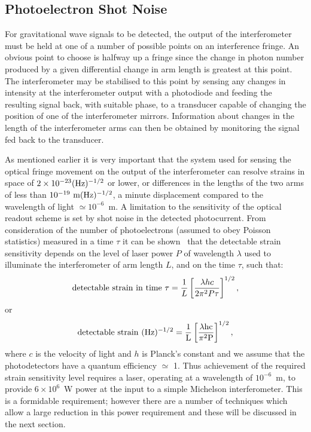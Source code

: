 \documentclass{article}
\begin{document}





\subsection{Photoelectron Shot Noise}
\label{subsection:shotnoise}

For gravitational wave signals to be detected, the output of the
interferometer must be held at one of a number of possible points on
an interference fringe. An obvious point to choose is halfway up a
fringe since the change in photon number produced by a given
differential change in arm length is greatest at this point.  The
interferometer may be stabilised to this point by sensing any changes
in intensity at the interferometer output with a photodiode and
feeding the resulting signal back, with suitable phase, to a
transducer capable of changing the position of one of the
interferometer mirrors.  Information about changes in the length of
the interferometer arms can then be obtained by monitoring the signal
fed back to the transducer.

As mentioned earlier it is very important that the system used for
sensing the optical fringe movement on the output of the
interferometer can resolve strains in space of $2 \times
10^{-23}(\rm Hz)^{-1/2}$ or lower, or differences in the lengths of the
two arms of less than $10^{-19}{\rm \ m(\rm Hz)^{-1/2}}$, a minute
displacement compared to the wavelength of light $\simeq 10^{-6}$~m. A
limitation to the sensitivity of the optical readout scheme is set by
shot noise in the detected photocurrent. From consideration of the
number of photoelectrons (assumed to obey Poisson statistics) measured
in a time $\tau$ it can be shown~\cite{HoughMG5} that the detectable
strain sensitivity depends on the level of laser power $P$ of
wavelength $\lambda$ used to illuminate the interferometer of arm
length $L$, and on the time $\tau$, such that:
%
\begin{equation}
  {\rm detectable\ strain\ in\ time\ } \tau = \frac 1{L}\left[\frac{\lambda h
  c}{2 \pi^{2} P \tau}\right]^{1/2},
  \label{equation:shot1}
\end{equation}
%
or
%
\begin{equation}
  {\rm detectable\ strain\ }(\rm Hz)^{-1/2} = \frac
  1{L}\left[\frac{\lambda h c}{\pi^{2} P }\right]^{1/2},
  \label{equation:shot2}
\end{equation}
%
where $c$ is the velocity of light and $h$ is Planck's constant and we
assume that the photodetectors have a quantum efficiency $\simeq$
1. Thus achievement of the required strain sensitivity level requires
a laser, operating at a wavelength of $10^{-6}$~m, to provide $6
\times 10^{6}$~W power at the input to a simple Michelson
interferometer. This is a formidable requirement; however there are a
number of techniques which allow a large reduction in this power
requirement and these will be discussed in the next section.
\end{document}
